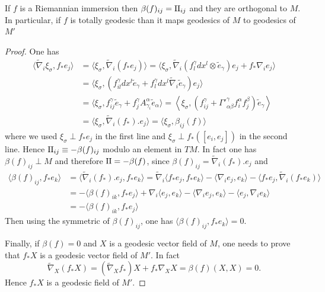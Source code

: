 \begin{lemma}
\label{lem:second-fund-form}
If \(f\) is a Riemannian immersion then \(\beta(f)_{ij} = \sff_{ij}\) and they are orthogonal
to \(M\).
In particular, if \(f\) is totally geodesic than it maps geodesics of \(M\) to
geodesics of \(M'\)
\end{lemma}
\begin{proof}
One has
\begin{equation}
\label{eq:second-fund-form}
\begin{align*}
\langle \tilde\nabla_i\xi_\sigma, f_* e_j\rangle &= \langle\xi_\sigma, \tilde\nabla_i (f_* e_j)\rangle
				      		  = \langle \xi_\sigma,\tilde\nabla_i(f^\gamma_l dx^l\otimes \tilde e_\gamma) e_j + f_* \nabla_i e_j \rangle\\
						  &= \langle \xi_\sigma, (f^\gamma_{il} dx^l\tilde e_\gamma + f^\gamma_l dx^l \tilde\nabla_i\tilde e_\gamma) e_j \rangle\\
						  &= \langle \xi_\sigma, f^\gamma_{ij} \tilde e_\gamma + f^\gamma_j A^\alpha_{\gamma_i}\tilde e_\alpha \rangle
						   = \left\langle \xi_\sigma,  \left(f^\gamma_{ij} + \Gamma'^\gamma_{\alpha\beta} f^\alpha_i f^\beta_j \right)\tilde e_\gamma \right\rangle \\ 
						  &= \langle\xi_\sigma,\tilde\nabla_i(f_*).e_j \rangle = \langle \xi_\sigma,\beta_{ij}(f) \rangle
\end{align*}   
\end{equation}
where we used \(\xi_\sigma \perp f_* e_j\) in the first line and \(\xi_\sigma
\perp f_*([e_i, e_j])\) in the second line. Hence \(\sff_{ij} \equiv -\beta(f)_{ij}\) modulo an element in \(TM\). In fact one has
\(\beta(f)_{ij}\perp M\) and therefore \(\sff = -\beta(f)\), since \(\beta(f)_{ij} =
\tilde \nabla_i (f_*). e_j\) and
\begin{equation*}
\begin{align*}
\langle \beta(f)_{ij}, f_* e_k \rangle &= \langle\tilde \nabla_i (f_*). e_j, f_* e_k
\rangle = \tilde\nabla_i \langle f_* e_j, f_* e_k \rangle - \langle  \nabla_i e_j, e_k \rangle -
\langle  f_*e_j, \tilde\nabla_i(f_* e_k) \rangle  \\
&=-\langle \beta(f)_{ik}, f_* e_j \rangle + \nabla_i \langle e_j,e_k \rangle - \langle
\nabla_i e_j, e_k \rangle - \langle e_j, \nabla_i e_k \rangle\\ &= -\langle \beta(f)_{ik}, f_* e_j \rangle
\end{align*}   
\end{equation*}
Then using the symmetric of \(\beta(f)_{ij}\), one has \(\langle \beta(f)_{ij}, f_* e_k
\rangle=0\).

Finally, if \(\beta(f)=0\) and \(X\) is a geodesic vector field of \(M\), one needs
to prove that \(f_*X\) is a geodesic vector field of \(M'\). In fact
\[
 \tilde\nabla_{X}(f_* X) = (\tilde\nabla_X f_*) X + f_*\nabla_X X = \beta(f)(X,X) = 0.
\]
Hence \(f_* X\) is a geodesic field of \(M'\). 
\end{proof}

